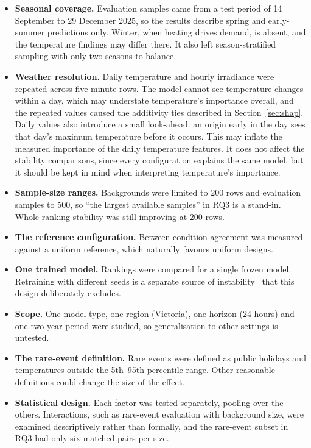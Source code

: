 \documentclass[11pt,a4paper]{article}
\begin{document}
\begin{itemize}
  \item \textbf{Seasonal coverage.} Evaluation samples came from a test period of 14 September to 29 December 2025, so the results describe spring and early-summer predictions only. Winter, when heating drives demand, is absent, and the temperature findings may differ there. It also left season-stratified sampling with only two seasons to balance.
  \item \textbf{Weather resolution.} Daily temperature and hourly irradiance were repeated across five-minute rows. The model cannot see temperature changes within a day, which may understate temperature's importance overall, and the repeated values caused the additivity ties described in Section~\ref{sec:shap}. Daily values also introduce a small look-ahead: an origin early in the day sees that day's maximum temperature before it occurs. This may inflate the measured importance of the daily temperature features. It does not affect the stability comparisons, since every configuration explains the same model, but it should be kept in mind when interpreting temperature's importance.
  \item \textbf{Sample-size ranges.} Backgrounds were limited to 200 rows and evaluation samples to 500, so ``the largest available samples'' in RQ3 is a stand-in. Whole-ranking stability was still improving at 200 rows.
  \item \textbf{The reference configuration.} Between-condition agreement was measured against a uniform reference, which naturally favours uniform designs.
  \item \textbf{One trained model.} Rankings were compared for a single frozen model. Retraining with different seeds is a separate source of instability~\cite{caraker2026} that this design deliberately excludes.
  \item \textbf{Scope.} One model type, one region (Victoria), one horizon (24 hours) and one two-year period were studied, so generalisation to other settings is untested.
  \item \textbf{The rare-event definition.} Rare events were defined as public holidays and temperatures outside the 5th--95th percentile range. Other reasonable definitions could change the size of the effect.
  \item \textbf{Statistical design.} Each factor was tested separately, pooling over the others. Interactions, such as rare-event evaluation with background size, were examined descriptively rather than formally, and the rare-event subset in RQ3 had only six matched pairs per size.

\end{itemize}
\end{document}

